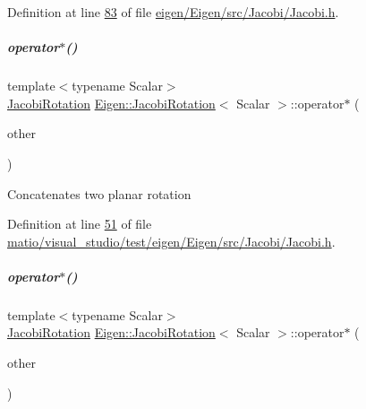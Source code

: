 Definition at line \hyperlink{eigen_2_eigen_2src_2_jacobi_2_jacobi_8h_source_l00083}{83} of file \hyperlink{eigen_2_eigen_2src_2_jacobi_2_jacobi_8h_source}{eigen/\+Eigen/src/\+Jacobi/\+Jacobi.\+h}.

\mbox{\label{group___jacobi___module_ada8389f291839964d7b481464f0e4e94}} 
\subparagraph{\texorpdfstring{operator$\ast$()}{operator*()}\hspace{0.1cm}{\footnotesize\ttfamily [1/2]}}
{\footnotesize\ttfamily template$<$typename Scalar$>$ \\
\hyperlink{group___jacobi___module_class_eigen_1_1_jacobi_rotation}{Jacobi\+Rotation} \hyperlink{group___jacobi___module_class_eigen_1_1_jacobi_rotation}{Eigen\+::\+Jacobi\+Rotation}$<$ Scalar $>$\+::operator$\ast$ (\begin{DoxyParamCaption}\item[{const \hyperlink{group___jacobi___module_class_eigen_1_1_jacobi_rotation}{Jacobi\+Rotation}$<$ Scalar $>$ \&}]{other }\end{DoxyParamCaption})\hspace{0.3cm}{\ttfamily [inline]}}

Concatenates two planar rotation 

Definition at line \hyperlink{matio_2visual__studio_2test_2eigen_2_eigen_2src_2_jacobi_2_jacobi_8h_source_l00051}{51} of file \hyperlink{matio_2visual__studio_2test_2eigen_2_eigen_2src_2_jacobi_2_jacobi_8h_source}{matio/visual\+\_\+studio/test/eigen/\+Eigen/src/\+Jacobi/\+Jacobi.\+h}.

\mbox{\label{group___jacobi___module_ada8389f291839964d7b481464f0e4e94}} 
\subparagraph{\texorpdfstring{operator$\ast$()}{operator*()}\hspace{0.1cm}{\footnotesize\ttfamily [2/2]}}
{\footnotesize\ttfamily template$<$typename Scalar$>$ \\
\hyperlink{group___jacobi___module_class_eigen_1_1_jacobi_rotation}{Jacobi\+Rotation} \hyperlink{group___jacobi___module_class_eigen_1_1_jacobi_rotation}{Eigen\+::\+Jacobi\+Rotation}$<$ Scalar $>$\+::operator$\ast$ (\begin{DoxyParamCaption}\item[{const \hyperlink{group___jacobi___module_class_eigen_1_1_jacobi_rotation}{Jacobi\+Rotation}$<$ Scalar $>$ \&}]{other }\end{DoxyParamCaption})\hspace{0.3cm}{\ttfamily [inline]}}

